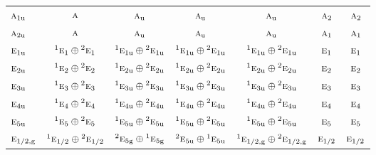 \documentclass[10pt,a4paper]{article}
\numberwithin{equation}{section}
\newcommand{\irr}[1]{\text{\normalfont\scshape #1}}
\newcommand{\conjpair}[1]{{}^{#1}}
\newcommand{\ptag}[1]{\mathrm{#1}}
\begin{document}
{\begin{longtable}{@{}lcccccc@{}}
$\irr{a}_{1\ptag{u}}$ & $\irr{a}$ & $\irr{a}_{\ptag{u}}$ & $\irr{a}_{\ptag{u}}$ & $\irr{a}_{\ptag{u}}$ & $\irr{a}_{2}$ & $\irr{a}_{2}$\\
$\irr{a}_{2\ptag{u}}$ & $\irr{a}$ & $\irr{a}_{\ptag{u}}$ & $\irr{a}_{\ptag{u}}$ & $\irr{a}_{\ptag{u}}$ & $\irr{a}_{1}$ & $\irr{a}_{1}$\\
$\irr{e}_{1\ptag{u}}$ & $\conjpair{1}\irr{e}_{1}\oplus \conjpair{2}\irr{e}_{1}$ & $\conjpair{1}\irr{e}_{1\ptag{u}}\oplus \conjpair{2}\irr{e}_{1\ptag{u}}$ & $\conjpair{1}\irr{e}_{1\ptag{u}}\oplus \conjpair{2}\irr{e}_{1\ptag{u}}$ & $\conjpair{1}\irr{e}_{1\ptag{u}}\oplus \conjpair{2}\irr{e}_{1\ptag{u}}$ & $\irr{e}_{1}$ & $\irr{e}_{1}$\\
$\irr{e}_{2\ptag{u}}$ & $\conjpair{1}\irr{e}_{2}\oplus \conjpair{2}\irr{e}_{2}$ & $\conjpair{1}\irr{e}_{2\ptag{u}}\oplus \conjpair{2}\irr{e}_{2\ptag{u}}$ & $\conjpair{1}\irr{e}_{2\ptag{u}}\oplus \conjpair{2}\irr{e}_{2\ptag{u}}$ & $\conjpair{1}\irr{e}_{2\ptag{u}}\oplus \conjpair{2}\irr{e}_{2\ptag{u}}$ & $\irr{e}_{2}$ & $\irr{e}_{2}$\\
$\irr{e}_{3\ptag{u}}$ & $\conjpair{1}\irr{e}_{3}\oplus \conjpair{2}\irr{e}_{3}$ & $\conjpair{1}\irr{e}_{3\ptag{u}}\oplus \conjpair{2}\irr{e}_{3\ptag{u}}$ & $\conjpair{1}\irr{e}_{3\ptag{u}}\oplus \conjpair{2}\irr{e}_{3\ptag{u}}$ & $\conjpair{1}\irr{e}_{3\ptag{u}}\oplus \conjpair{2}\irr{e}_{3\ptag{u}}$ & $\irr{e}_{3}$ & $\irr{e}_{3}$\\
$\irr{e}_{4\ptag{u}}$ & $\conjpair{1}\irr{e}_{4}\oplus \conjpair{2}\irr{e}_{4}$ & $\conjpair{1}\irr{e}_{4\ptag{u}}\oplus \conjpair{2}\irr{e}_{4\ptag{u}}$ & $\conjpair{1}\irr{e}_{4\ptag{u}}\oplus \conjpair{2}\irr{e}_{4\ptag{u}}$ & $\conjpair{1}\irr{e}_{4\ptag{u}}\oplus \conjpair{2}\irr{e}_{4\ptag{u}}$ & $\irr{e}_{4}$ & $\irr{e}_{4}$\\
$\irr{e}_{5\ptag{u}}$ & $\conjpair{1}\irr{e}_{5}\oplus \conjpair{2}\irr{e}_{5}$ & $\conjpair{1}\irr{e}_{5\ptag{u}}\oplus \conjpair{2}\irr{e}_{5\ptag{u}}$ & $\conjpair{1}\irr{e}_{5\ptag{u}}\oplus \conjpair{2}\irr{e}_{5\ptag{u}}$ & $\conjpair{1}\irr{e}_{5\ptag{u}}\oplus \conjpair{2}\irr{e}_{5\ptag{u}}$ & $\irr{e}_{5}$ & $\irr{e}_{5}$\\
$\irr{e}_{1/2,\ptag{g}}$ & $\conjpair{1}\irr{e}_{1/2}\oplus \conjpair{2}\irr{e}_{1/2}$ & $\conjpair{2}\irr{e}_{5\ptag{g}}\oplus \conjpair{1}\irr{e}_{5\ptag{g}}$ & $\conjpair{2}\irr{e}_{5\ptag{u}}\oplus \conjpair{1}\irr{e}_{5\ptag{u}}$ & $\conjpair{1}\irr{e}_{1/2,\ptag{g}}\oplus \conjpair{2}\irr{e}_{1/2,\ptag{g}}$ & $\irr{e}_{1/2}$ & $\irr{e}_{1/2}$\\

\end{longtable}}
\end{document}
